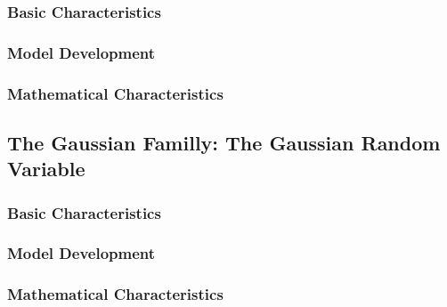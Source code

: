 \documentclass[twoside]{article}
\theoremstyle{definition}
\theoremstyle{remark}
\theoremstyle{remark}
\begin{document}
\subsubsection{Basic Characteristics}
\subsubsection{Model Development}
\subsubsection{Mathematical Characteristics}

\subsection{The Gaussian Familly: The Gaussian Random Variable}
\subsubsection{Basic Characteristics}
\subsubsection{Model Development}
\subsubsection{Mathematical Characteristics}


\printbibliography

\end{document}
